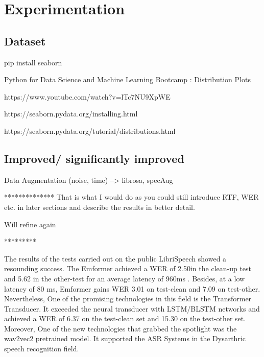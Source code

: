 \chapter{Experimentation}
\label{cha:comparison}
\section{Dataset}


pip install seaborn

Python for Data Science and Machine Learning Bootcamp : Distribution Plots

https://www.youtube.com/watch?v=lTc7NU9XpWE

https://seaborn.pydata.org/installing.html


https://seaborn.pydata.org/tutorial/distributions.html



\section{Improved/ significantly improved}



Data Augmentation (noise, time) --> librosa, specAug






**************
That is what I would do as you could still introduce RTF, WER etc. in later sections and describe the results in better detail. 

Will refine again

*********

The results of the tests carried out on the public LibriSpeech showed a resounding success. The Emformer achieved a WER of 2.50\text{\%}in the clean-up test and 5.62\text{\%} in the other-test for an average latency of 960ms \cite{shi2021emformer}. Besides, at a low latency of 80 ms, Emformer gains WER 3.01\text{\%} on test-clean and 7.09\text{\%} on test-other. Nevertheless, One of the promising technologies in this field is the Transformer Transducer. It exceeded the neural transducer with LSTM/BLSTM networks and achieved a WER of 6.37\text{\%} on the test-clean set and 15.30\text{\%} on the test-other set\cite{yeh2019transformer}. Moreover, One of the new technologies that grabbed the spotlight was the wav2vec2 pretrained model. It supported the ASR Systems in the Dysarthric speech recognition field\cite{karthick2022speaker}. 
